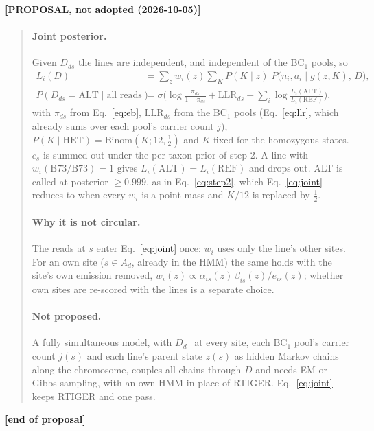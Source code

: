 \documentclass[11pt]{article}
\newcommand{\REF}{\mathrm{REF}}
\newcommand{\HET}{\mathrm{HET}}
\newcommand{\ALT}{\mathrm{ALT}}
\newcommand{\Bin}{\mathrm{Binom}}
\newcommand{\LLR}{\mathrm{LLR}}
\newenvironment{proposal}[1]
  {\par\medskip\noindent\textbf{[PROPOSAL, not adopted (#1)]}\begin{quote}\small}
  {\end{quote}\noindent\textbf{[end of proposal]}\par\medskip}
\begin{document}
\begin{proposal}{2026-10-05}
\paragraph{Joint posterior.} Given $D_{ds}$ the lines are independent, and independent of the BC$_1$ pools, so
\begin{align}
L_i(D) &= \sum_{z} w_i(z)\sum_{K} P(K\mid z)\;P\big(n_i,a_i\mid g(z,K),\,D\big),\\
P(D_{ds}=\ALT\mid \text{all reads}) &= \sigma\!\Big(\log\frac{\pi_{ds}}{1-\pi_{ds}}+\LLR_{ds}+\sum_i\log\frac{L_i(\ALT)}{L_i(\REF)}\Big),
\label{eq:joint}
\end{align}
with $\pi_{ds}$ from Eq.~\eqref{eq:eb}, $\LLR_{ds}$ from the BC$_1$ pools (Eq.~\eqref{eq:llr}, which already sums over each pool's
carrier count $j$), $P(K\mid\HET)=\Bin(K;12,\tfrac12)$ and $K$ fixed for the homozygous states. $c_s$ is summed out under the per-taxon
prior of step 2. A line with $w_i(\mathrm{B73/B73})=1$ gives $L_i(\ALT)=L_i(\REF)$ and drops out. ALT is called at posterior $\ge0.999$,
as in Eq.~\eqref{eq:step2}, which Eq.~\eqref{eq:joint} reduces to when every $w_i$ is a point mass and $K/12$ is replaced by $\tfrac12$.

\paragraph{Why it is not circular.} The reads at $s$ enter Eq.~\eqref{eq:joint} once: $w_i$ uses only the line's other sites. For an own
site ($s\in A_d$, already in the HMM) the same holds with the site's own emission removed,
$w_i(z)\propto\alpha_{is}(z)\,\beta_{is}(z)/e_{is}(z)$; whether own sites are re-scored with the lines is a separate choice.

\paragraph{Not proposed.} A fully simultaneous model, with $D_{d\cdot}$ at every site, each BC$_1$ pool's carrier count $j(s)$ and each
line's parent state $z(s)$ as hidden Markov chains along the chromosome, couples all chains through $D$ and needs EM or Gibbs sampling,
with an own HMM in place of RTIGER. Eq.~\eqref{eq:joint} keeps RTIGER and one pass.


\end{proposal}
\end{document}
